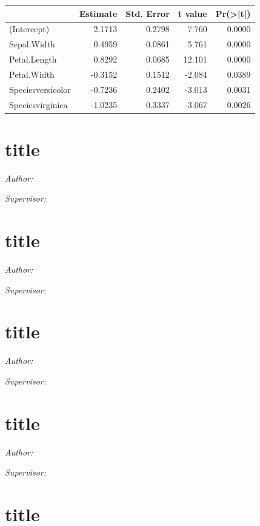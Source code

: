 \documentclass[
]{krantz}
\begin{document}
\begin{tabular}{l|r|r|r|r}
\hline
  & Estimate & Std. Error & t value & Pr(>|t|)\\
\hline
(Intercept) & 2.1713 & 0.2798 & 7.760 & 0.0000\\
\hline
Sepal.Width & 0.4959 & 0.0861 & 5.761 & 0.0000\\
\hline
Petal.Length & 0.8292 & 0.0685 & 12.101 & 0.0000\\
\hline
Petal.Width & -0.3152 & 0.1512 & -2.084 & 0.0389\\
\hline
Speciesversicolor & -0.7236 & 0.2402 & -3.013 & 0.0031\\
\hline
Speciesvirginica & -1.0235 & 0.3337 & -3.067 & 0.0026\\
\hline
\end{tabular}

\hypertarget{title-3}{%
\chapter{title}\label{title-3}}

\emph{Author: }

\emph{Supervisor: }

\hypertarget{title-4}{%
\chapter{title}\label{title-4}}

\emph{Author: }

\emph{Supervisor: }

\hypertarget{title-5}{%
\chapter{title}\label{title-5}}

\emph{Author: }

\emph{Supervisor: }

\hypertarget{title-6}{%
\chapter{title}\label{title-6}}

\emph{Author: }

\emph{Supervisor: }

\hypertarget{title-7}{%
\chapter{title}\label{title-7}}
\end{document}
